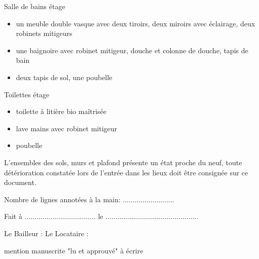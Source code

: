 \documentclass[a4paper,11pt]{article}
\begin{document}
Salle de bains étage
\begin{itemize}
\item un meuble double vasque avec deux tiroirs, deux miroirs avec éclairage, deux robinets mitigeurs
\item une baignoire avec robinet mitigeur, douche et colonne de douche, tapis de bain
\item deux tapis de sol, une poubelle
\end{itemize}

\vspace{0.5cm}

Toilettes étage
\begin{itemize}
\item toilette à litière bio maîtrisée
\item lave mains avec robinet mitigeur
\item poubelle
\end{itemize}

\vspace{0.25cm}

L'ensembles des sols, murs et plafond présente un état proche du neuf, toute détérioration constatée lors de l'entrée dans les lieux doit être consignée sur ce document.

\vspace{0.25cm}

Nombre de lignes annotées à la main: ..........................

\vspace{0.25cm}

Fait à .................................... le ...............................................

\vspace{0.25cm}

Le Bailleur : \hspace{3cm}Le Locataire : 

\hspace{5.2cm}mention manuscrite "lu et approuvé" à écrire


\newpage{}
\end{document}

